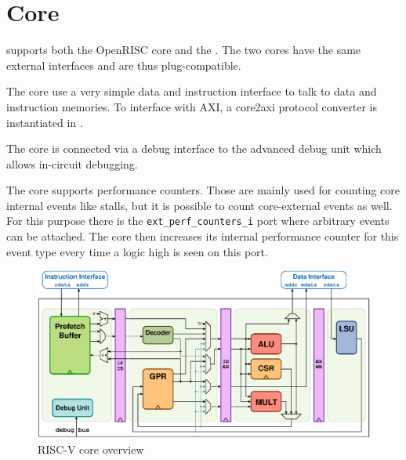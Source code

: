\chapter{Core}

\pulpino supports both the OpenRISC \orion core and the \riscv \rvcore. The two
cores have the same external interfaces and are thus plug-compatible.

The core use a very simple data and instruction interface to talk to data and
instruction memories. To interface with AXI, a core2axi protocol converter is
instantiated in \pulpino.

The core is connected via a debug interface to the advanced debug unit which
allows in-circuit debugging.

The core supports performance counters. Those are mainly used for counting core
internal events like stalls, but it is possible to count core-external events
as well. For this purpose there is the \texttt{ext\_perf\_counters\_i} port where
arbitrary events can be attached. The core then increases its internal
performance counter for this event type every time a logic high is seen on this
port.

\begin{figure}[ht]
  \centering
  \includegraphics[width=\textwidth]{./figures/riscv_overview}
  \caption{RISC-V core overview}
  \label{fig1}
\end{figure}
